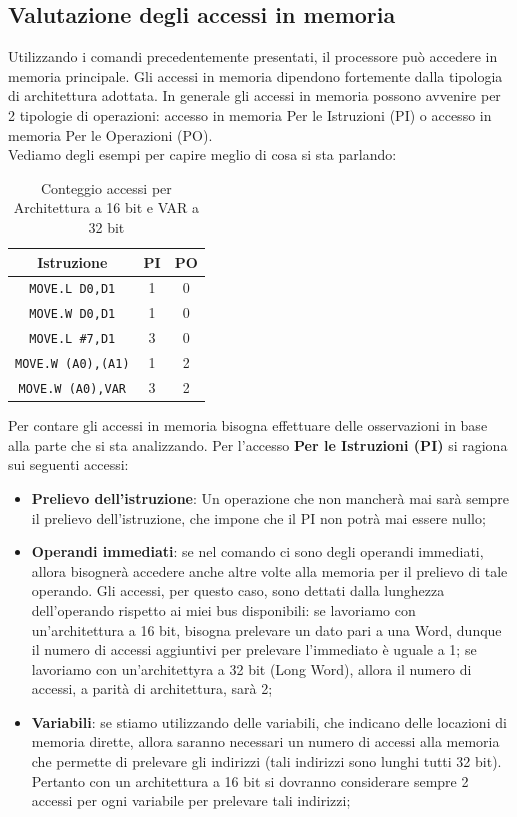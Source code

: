 \subsection{Valutazione degli accessi in memoria}
Utilizzando i comandi precedentemente presentati, il processore può accedere in memoria principale. Gli accessi in memoria dipendono fortemente dalla tipologia di architettura adottata. In generale gli accessi in memoria possono avvenire per 2 tipologie di operazioni: accesso in memoria Per le Istruzioni (PI) o accesso in memoria Per le Operazioni (PO). \\
Vediamo degli esempi per capire meglio di cosa si sta parlando:
\begin{table}[h]
    \centering
    \begin{tabular}{|c|c|c|}
        \hline
        \textbf{Istruzione} & \textbf{PI} & \textbf{PO} \\
        \hline
        \lstinline|MOVE.L D0,D1| & 1 & 0 \\
        \lstinline|MOVE.W D0,D1| & 1 & 0 \\
        \lstinline|MOVE.L #7,D1| & 3 & 0 \\
        \lstinline|MOVE.W (A0),(A1)| & 1 & 2 \\
        \lstinline|MOVE.W (A0),VAR| & 3 & 2 \\
        \hline
    \end{tabular}
    \caption{Conteggio accessi per Architettura a 16 bit e VAR a 32 bit}
    \label{tab:esempio}
\end{table}

Per contare gli accessi in memoria bisogna effettuare delle osservazioni in base alla parte che si sta analizzando.
Per l'accesso \textbf{Per le Istruzioni (PI)} si ragiona sui seguenti accessi:
\begin{itemize}
    \item \textbf{Prelievo dell'istruzione}: Un operazione che non mancherà mai sarà sempre il prelievo dell'istruzione, che impone che il PI non potrà mai essere nullo;
    \item \textbf{Operandi immediati}: se nel comando ci sono degli operandi immediati, allora bisognerà accedere anche altre volte alla memoria per il prelievo di tale operando. Gli accessi, per questo caso, sono dettati dalla lunghezza dell'operando rispetto ai miei bus disponibili: se lavoriamo con un'architettura a 16 bit, bisogna prelevare un dato pari a una Word, dunque il numero di accessi aggiuntivi per prelevare l'immediato è uguale a 1; se lavoriamo con un'architettyra a 32 bit (Long Word), allora il numero di accessi, a parità di architettura, sarà 2;
    \item \textbf{Variabili}: se stiamo utilizzando delle variabili, che indicano delle locazioni di memoria dirette, allora saranno necessari un numero di accessi alla memoria che permette di prelevare gli indirizzi (tali indirizzi sono lunghi tutti 32 bit). Pertanto con un architettura a 16 bit si dovranno considerare sempre 2 accessi per ogni variabile per prelevare tali indirizzi;
\end{itemize}

